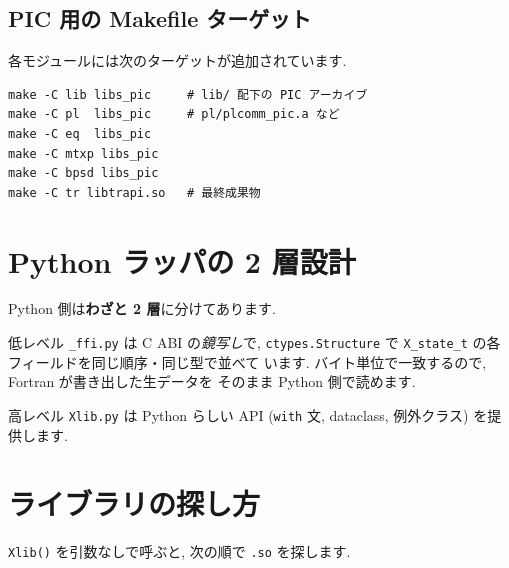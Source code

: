 \documentclass[11pt,a4paper]{report}
\begin{document}
\subsection*{PIC 用の Makefile ターゲット}

各モジュールには次のターゲットが追加されています.

\begin{lstlisting}[style=bash]
make -C lib libs_pic     # lib/ 配下の PIC アーカイブ
make -C pl  libs_pic     # pl/plcomm_pic.a など
make -C eq  libs_pic
make -C mtxp libs_pic
make -C bpsd libs_pic
make -C tr libtrapi.so   # 最終成果物
\end{lstlisting}

\section{Python ラッパの 2 層設計}

Python 側は\textbf{わざと 2 層}に分けてあります.

\begin{center}
\end{center}

低レベル \texttt{\_ffi.py} は C ABI の\emph{鏡写し}で, \texttt{ctypes.Structure}
で \texttt{X\_state\_t} の各フィールドを同じ順序・同じ型で並べて
います. バイト単位で一致するので, Fortran が書き出した生データを
そのまま Python 側で読めます.

高レベル \texttt{Xlib.py} は Python らしい API (\texttt{with} 文,
dataclass, 例外クラス) を提供します.

\section{ライブラリの探し方}

\texttt{Xlib()} を引数なしで呼ぶと, 次の順で \texttt{.so} を探します.
\end{document}
